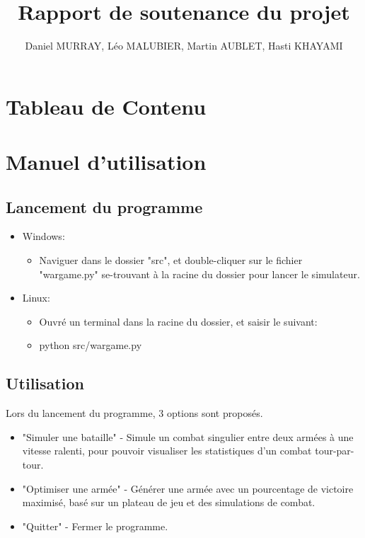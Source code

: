 \documentclass[a4paper, 11pt]{article}
\title {Rapport de soutenance du projet}
\author {Daniel MURRAY, Léo MALUBIER, Martin AUBLET, Hasti KHAYAMI}
\begin{document}
\maketitle

\newpage

\section{Tableau de Contenu}

\tableofcontents

\newpage

\section{Manuel d'utilisation}

\subsection{Lancement du programme}

\begin{itemize}

\item{Windows:}
\begin{itemize}

\item{Naviguer dans le dossier "src", et double-cliquer sur le fichier "wargame.py" se-trouvant à la racine du dossier pour lancer le simulateur.}

\end{itemize}
\item{Linux:}
\begin{itemize}

\item{Ouvré un terminal dans la racine du dossier, et saisir le suivant:}
\item{python src/wargame.py}

\end{itemize}

\end{itemize}


\subsection{Utilisation}

Lors du lancement du programme, 3 options sont proposés.

\begin{itemize}

\item{"Simuler une bataille" - Simule un combat singulier entre deux armées à une vitesse ralenti, pour pouvoir visualiser les statistiques d'un combat tour-par-tour.}
\item{"Optimiser une armée" - Générer une armée avec un pourcentage de victoire maximisé, basé sur un plateau de jeu et des simulations de combat.}
\item{"Quitter" - Fermer le programme.}

\end{itemize}
\end{document}
